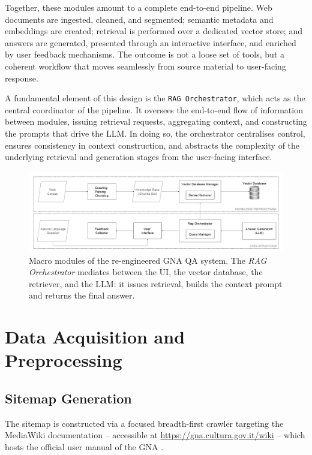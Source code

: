 \begin{spacing}{1.5}
Together, these modules amount to a complete end-to-end pipeline. Web documents are ingested, cleaned, and segmented; semantic metadata and embeddings are created; retrieval is performed over a dedicated vector store; and answers are generated, presented through an interactive interface, and enriched by user feedback mechanisms. The outcome is not a loose set of tools, but a coherent workflow that moves seamlessly from source material to user-facing response.

A fundamental element of this design is the \texttt{RAG Orchestrator}, which acts as the central coordinator of the pipeline. It oversees the end-to-end flow of information between modules, issuing retrieval requests, aggregating context, and constructing the prompts that drive the LLM. In doing so, the orchestrator centralises control, ensures consistency in context construction, and abstracts the complexity of the underlying retrieval and generation stages from the user-facing interface.


\begin{figure}[H]
  \centering
  \includegraphics[width=\textwidth]{images/dataflow_arch.png} 
  \caption{Macro modules of the re-engineered GNA QA system. The \emph{RAG Orchestrator} mediates between the UI, the vector database, the retriever, and the LLM: it issues retrieval, builds the context prompt and returns the final answer.}
  \label{fig:dataflow}
\end{figure}

\sloppy
\section{Data Acquisition and Preprocessing}
\subsection{Sitemap Generation}
The sitemap is constructed via a focused breadth-first crawler targeting the MediaWiki documentation -- accessible at \url{https://gna.cultura.gov.it/wiki} -- which hosts the official user manual of the GNA \citep{mic_mic_2019}. 


\end{spacing}
